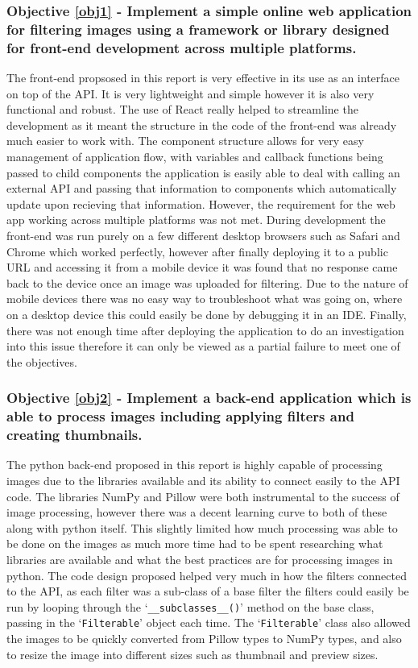 \documentclass[a4paper,12pt]{report}
\begin{document}
  \newpage
  \subsubsection{Objective \ref{obj1} - Implement a simple online web application for filtering images using a framework or library designed for front-end development across multiple platforms.}
    The front-end propsosed in this report is very effective in its use as an interface on top of the API. It is very lightweight and simple however it is also very functional and robust. The use of React really helped to streamline the development as it meant the structure in the code of the front-end was already much easier to work with. The component structure allows for very easy management of application flow, with variables and callback functions being passed to child components the application is easily able to deal with calling an external API and passing that information to components which automatically update upon recieving that information. However, the requirement for the web app working across multiple platforms was not met. During development the front-end was run purely on a few different desktop browsers such as Safari and Chrome which worked perfectly, however after finally deploying it to a public URL and accessing it from a mobile device it was found that no response came back to the device once an image was uploaded for filtering. Due to the nature of mobile devices there was no easy way to troubleshoot what was going on, where on a desktop device this could easily be done by debugging it in an IDE. Finally, there was not enough time after deploying the application to do an investigation into this issue therefore it can only be viewed as a partial failure to meet one of the objectives.

  \subsubsection{Objective \ref{obj2} - Implement a back-end application which is able to process images including applying filters and creating thumbnails.}
    The python back-end proposed in this report is highly capable of processing images due to the libraries available and its ability to connect easily to the API code. The libraries NumPy and Pillow were both instrumental to the success of image processing, however there was a decent learning curve to both of these along with python itself. This slightly limited how much processing was able to be done on the images as much more time had to be spent researching what libraries are available and what the best practices are for processing images in python. The code design proposed helped very much in how the filters connected to the API, as each filter was a sub-class of a base filter the filters could easily be run by looping through the ‘\texttt{\_\_subclasses\_\_()}’ method on the base class, passing in the ‘\texttt{Filterable}’ object each time. The ‘\texttt{Filterable}’ class also allowed the images to be quickly converted from Pillow types to NumPy types, and also to resize the image into different sizes such as thumbnail and preview sizes.
\end{document}
